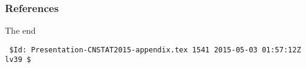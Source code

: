 
 

\begin{slide}
\frametitle{References}
\tiny
 

\end{slide}
\ifpdf
{}
\fi




%
%

\begin{frame}[fragile]
{\huge The end}
\vfill
\verbatimsize
\begin{verbatim}
 $Id: Presentation-CNSTAT2015-appendix.tex 1541 2015-05-03 01:57:12Z lv39 $
\end{verbatim}
\end{frame}



